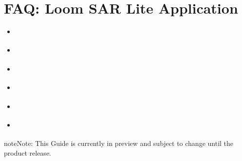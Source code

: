 \documentclass[letterpaper,10pt,english]{sphinxmanual}
\begin{document}
\chapter{FAQ: Loom SAR Lite Application}
\label{\detokenize{loom_trbs_faq:faq-loom-sar-lite-application}}\label{\detokenize{loom_trbs_faq:faq-sar-lite-app}}
\begin{sphinxShadowBox}
\begin{itemize}
\item {} 
\label{\detokenize{loom_trbs_faq:id43}}{\hyperref[\detokenize{loom_trbs_faq:what-is-sar}]{}}

\item {} 
\label{\detokenize{loom_trbs_faq:id44}}{\hyperref[\detokenize{loom_trbs_faq:what-is-sar-lite}]{}}

\item {} 
\label{\detokenize{loom_trbs_faq:id45}}{\hyperref[\detokenize{loom_trbs_faq:does-it-support-review-or-redaction-of-files}]{}}

\item {} 
\label{\detokenize{loom_trbs_faq:id46}}{\hyperref[\detokenize{loom_trbs_faq:what-features-does-sar-lite-offer}]{}}

\item {} 
\label{\detokenize{loom_trbs_faq:id47}}{\hyperref[\detokenize{loom_trbs_faq:does-sar-lite-warn-the-user-about-insufficient-resources-for-responding-to-sar-request}]{}}

\item {} 
\label{\detokenize{loom_trbs_faq:id48}}{\hyperref[\detokenize{loom_trbs_faq:does-sar-lite-provide-integration-into-any-ticketing-or-workflow-systems}]{}}

\end{itemize}
\end{sphinxShadowBox}

\begin{sphinxadmonition}{note}{Note:}
This Guide is currently in preview and subject to change until the product release.
\end{sphinxadmonition}
\end{document}
